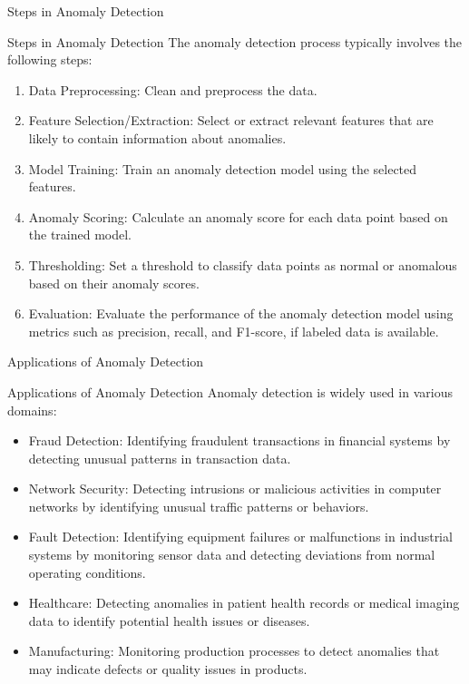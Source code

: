 \documentclass[hyperref={pdfpagelabels=false},aspectratio=169]{beamer}
\begin{document}
\begin{frame}[label={sec:org8fe6eca}]{Steps in Anomaly Detection}
\begin{block}{Steps in Anomaly Detection}
\pause
The anomaly detection process typically involves the following steps:
\begin{enumerate}[<+->]
\item \alert{Data Preprocessing}: Clean and preprocess the data.
\item \alert{Feature Selection/Extraction}: Select or extract relevant features that are likely to contain information about anomalies.
\item \alert{Model Training}: Train an anomaly detection model using the selected features.
\item \alert{Anomaly Scoring}: Calculate an anomaly score for each data point based on the trained model.
\item \alert{Thresholding}: Set a threshold to classify data points as normal or anomalous based on their anomaly scores.
\item \alert{Evaluation}: Evaluate the performance of the anomaly detection model using metrics such as precision, recall, and F1-score, if labeled data is available.
\end{enumerate}
\end{block}
\end{frame}
\begin{frame}[label={sec:org342d721}]{Applications of Anomaly Detection}
\begin{block}{Applications of Anomaly Detection}
\pause
Anomaly detection is widely used in various domains:
\begin{itemize}[<+->]
\item \alert{\alert{Fraud Detection}}: Identifying fraudulent transactions in financial systems by detecting unusual patterns in transaction data.
\item \alert{\alert{Network Security}}: Detecting intrusions or malicious activities in computer networks by identifying unusual traffic patterns or behaviors.
\item \alert{\alert{Fault Detection}}: Identifying equipment failures or malfunctions in industrial systems by monitoring sensor data and detecting deviations from normal operating conditions.
\item \alert{\alert{Healthcare}}: Detecting anomalies in patient health records or medical imaging data to identify potential health issues or diseases.
\item \alert{\alert{Manufacturing}}: Monitoring production processes to detect anomalies that may indicate defects or quality issues in products.
\end{itemize}
\end{block}
\end{frame}
\end{document}
